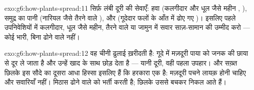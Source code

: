 \begin{solution}{exo:g6:how-plants-spread:11}
सिर्फ़ लंबी दूरी की सेवाएँ: हवा (कलगीदार और धूल जैसे महीन , ),
समुद्र का पानी (नारियल जैसे तैरने वाले ), और  (गूदेदार फलों के
आँत में ढोए गए )। इसलिए पहले उपनिवेशियों में कलगीदार, धूल जैसे महीन,
तैरने वाले या जामुन में सवार साज़-सामान की उम्मीद करो --- कोई भारी,
बिना ढोने वाले  नहीं।
\end{solution}

\begin{solution}{exo:g6:how-plants-spread:12}
वह चीनी ढुलाई ख़रीदती है: गूदे में मज़दूरी पाया   को जनक की
छाया से दूर ले जाता है और उन्हें खाद के साथ छोड़ देता है --- यानी दूरी,
वही पहला उपहार। और सख़्त छिलके इस सौदे का दूसरा आधा हिस्सा इसलिए हैं कि
हरकारा एक  है: मज़दूरी पचने लायक़ होनी चाहिए और सवारियाँ नहीं।
मिठास ढोने वाले को भर्ती करती है; छिलके उससे बचकर निकल आते हैं।
\end{solution}

